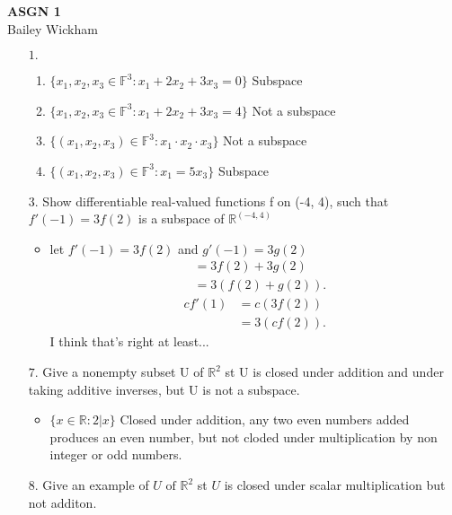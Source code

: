\documentclass[a4paper]{article}
\begin{document}
\begin{center}
    {\LARGE \bf ASGN 1\\}
    {\large Bailey Wickham}
\end{center}

\begin{enumerate}

   \item[$1.$]  \begin{enumerate}
    \item $\{x_{1}, x_{2}, x_{3} \in  \mathbb{F}^3: x_{1} + 2x_{2} + 3x_{3} = 0\}$ Subspace
    \item $\{x_{1}, x_{2}, x_{3} \in  \mathbb{F}^3: x_{1} + 2x_{2} + 3x_{3} = 4\}$ Not a subspace
    \item $\{(x_{1}, x_{2}, x_{3}) \in \mathbb{F}^3 : x_{1} \cdot x_{2} \cdot x_{3}\}  $  Not a subspace
    \item $\{(x_{1}, x_{2}, x_{3}) \in \mathbb{F}^3 : x_{1} = 5x_{3}\}  $ Subspace
    \end{enumerate}
\item[$3.$]  Show differentiable real-valued functions f on (-4, 4), such that \\$f'(-1) = 3f(2)$ is a subspace of $\mathbb{R}^{(-4,4)}$
    \begin{itemize}
        \item let $f'(-1) = 3f(2) $ and $g'(-1) = 3g(2)$
            \begin{align*}
                &= 3f(2) + 3g(2) \\
                &= 3(f(2) + g(2))
            .\end{align*}
            \begin{align*}
                cf'(1) &= c(3f(2)) \\
                &= 3(cf(2))
            .\end{align*}
            I think that's right at least...
    \end{itemize}
\item[$7.$] Give a nonempty subset U of $\mathbb{R}^2$ st U is closed under addition and under taking additive inverses, but U is not a subspace.
    \begin{itemize}
        \item $\{x \in \mathbb{R} : 2 | x\}  $ Closed under addition, any two even numbers added produces an even number, but not cloded under multiplication by non integer or odd numbers.
    \end{itemize}
        \item[$8.$]  Give an example of $U \text{ of } \mathbb{R}^2$ st $U$ is closed under scalar multiplication but not additon.

\end{enumerate}
\end{document}
